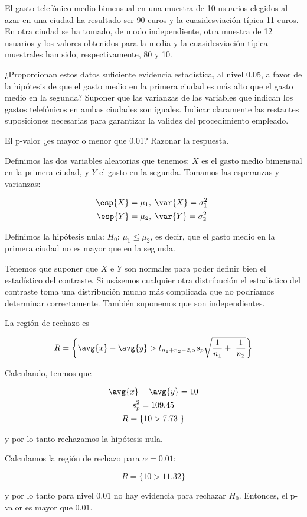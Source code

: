 \begin{problem}[5] El gasto telefónico medio bimensual en una muestra de 10 usuarios elegidos al azar en una ciudad ha resultado ser 90 euros y la cuasidesviación típica 11 euros. En otra ciudad se ha tomado, de modo independiente, otra muestra de 12 usuarios y los valores obtenidos para la media y la cuasidesviación típica muestrales han sido, respectivamente, 80 y 10.

\ppart ¿Proporcionan estos datos suficiente evidencia estadística, al nivel 0.05, a favor de la hipótesis  de que el gasto medio en la primera ciudad es más alto que el gasto medio en la segunda? Suponer que las varianzas de las variables que indican los gastos telefónicos en ambas ciudades son iguales. Indicar claramente las restantes suposiciones necesarias para garantizar la validez del procedimiento empleado.

\ppart El p-valor ¿es mayor o menor que 0.01? Razonar la respuesta.

\solution

\spart Definimos las dos variables aleatorias que tenemos: $X$ es el gasto medio bimensual en la primera ciudad, y $Y$ el gasto en la segunda. Tomamos las esperanzas y varianzas:

\begin{gather*}
\esp{X} = \mu_1,\;\var{X} = \sigma_1^2 \\
\esp{Y} = \mu_2,\;\var{Y} = \sigma_2^2 
\end{gather*}

 Definimos la hipótesis nula: $H_0:\, \mu_1\leq\mu_2$, es decir, que el gasto medio en la primera ciudad no es mayor que en la segunda.
 
 Tenemos que suponer que $X$ e $Y$ son normales para poder definir bien el estadístico del contraste. Si usásemos cualquier otra distribución el estadístico del contraste toma una distribución mucho más complicada que no podríamos determinar correctamente. También suponemos que son independientes.                       

La región de rechazo es 

\[ R = \left\{ \avg{x} - \avg{y} > t_{n_1+n_2-2, \alpha} s_p\sqrt{\frac{1}{n_1} + \frac{1}{n_2}}\right\} \] 

Calculando, tenmos que 

\begin{gather*}
\avg{x}-\avg{y} = 10\\
s_p^2 = 109.45 \\
R= \{10 > 7.73 \}
\end{gather*}

y por lo tanto rechazamos la hipótesis nula.

\spart Calculamos la región de rechazo para $\alpha=0.01$:

\[ R= \{10 > 11.32 \} \]

y por lo tanto para nivel $0.01$ no hay evidencia para rechazar $H_0$. Entonces, el p-valor es mayor que $0.01$.

\end{problem}

